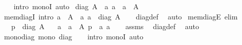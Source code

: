 \begin{isabellebody}
%
\isadelimproof
\ \ %
\endisadelimproof
%
\isatagproof
{}\isamarkupfalse%
\ {\isacharparenleft}{\kern0pt}intro\ monoI{\isacharparenright}{\kern0pt}\ auto%
\endisatagproof
{\isafoldproof}%
%
\isadelimproof
%
\endisadelimproof
%
\isadelimdocument
%
\endisadelimdocument
%
\isatagdocument
%
\isamarkuptrue%
%
\endisatagdocument
{\isafolddocument}%
%
\isadelimdocument
%
\endisadelimdocument
{}\isamarkupfalse%
\ {\isachardoublequoteopen}diag\ A\ {\isasymequiv}\ {\isacharbraceleft}{\kern0pt}{\isasymlangle}a{\isacharcomma}{\kern0pt}\ a{\isasymrangle}\ {\isacharbar}{\kern0pt}\ a\ {\isasymin}\ A{\isacharbraceright}{\kern0pt}{\isachardoublequoteclose}\isanewline
\isanewline
{}\isamarkupfalse%
\ mem{\isacharunderscore}{\kern0pt}diagI\ {\isacharbrackleft}{\kern0pt}intro{\isacharbang}{\kern0pt}{\isacharbrackright}{\kern0pt}{\isacharcolon}{\kern0pt}\ {\isachardoublequoteopen}a\ {\isasymin}\ A\ {\isasymLongrightarrow}\ {\isasymlangle}a{\isacharcomma}{\kern0pt}\ a{\isasymrangle}\ {\isasymin}\ diag\ A{\isachardoublequoteclose}\isanewline
%
\isadelimproof
\ \ %
\endisadelimproof
%
\isatagproof
{}\isamarkupfalse%
\ diag{\isacharunderscore}{\kern0pt}def\ \isamarkupfalse%
\ auto%
\endisatagproof
{\isafoldproof}%
%
\isadelimproof
\isanewline
%
\endisadelimproof
\isanewline
{}\isamarkupfalse%
\ mem{\isacharunderscore}{\kern0pt}diagE\ {\isacharbrackleft}{\kern0pt}elim{\isacharbang}{\kern0pt}{\isacharbrackright}{\kern0pt}{\isacharcolon}{\kern0pt}\isanewline
\ \ \ {\isachardoublequoteopen}p\ {\isasymin}\ diag\ A{\isachardoublequoteclose}\isanewline
\ \ \ a\ \ {\isachardoublequoteopen}a\ {\isasymin}\ A{\isachardoublequoteclose}\ {\isachardoublequoteopen}p\ {\isacharequal}{\kern0pt}\ {\isasymlangle}a{\isacharcomma}{\kern0pt}\ a{\isasymrangle}{\isachardoublequoteclose}\isanewline
%
\isadelimproof
\ \ %
\endisadelimproof
%
\isatagproof
{}\isamarkupfalse%
\ assms\ \isamarkupfalse%
\ diag{\isacharunderscore}{\kern0pt}def\ \isamarkupfalse%
\ auto%
\endisatagproof
{\isafoldproof}%
%
\isadelimproof
\isanewline
%
\endisadelimproof
\isanewline
{}\isamarkupfalse%
\ mono{\isacharunderscore}{\kern0pt}diag{\isacharcolon}{\kern0pt}\ {\isachardoublequoteopen}mono\ diag{\isachardoublequoteclose}\isanewline
%
\isadelimproof
\ \ %
\endisadelimproof
%
\isatagproof
{}\isamarkupfalse%
\ {\isacharparenleft}{\kern0pt}intro\ monoI{\isacharparenright}{\kern0pt}\ auto%
\endisatagproof
{\isafoldproof}%
%
\isadelimproof
\isanewline
%
\endisadelimproof
\isanewline
%
\isadelimtheory
\isanewline
%
\endisadelimtheory
%
\isatagtheory
{}\isamarkupfalse%
%
\endisatagtheory
{\isafoldtheory}%
%
\isadelimtheory
%
\endisadelimtheory
%
\end{isabellebody}%
